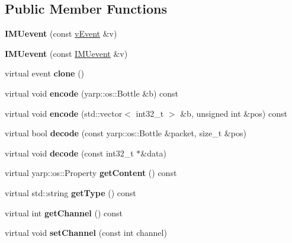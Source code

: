 \subsection*{Public Member Functions}
\begin{DoxyCompactItemize}
\item 
\mbox{\label{classev_1_1IMUevent_aeafbaa4f2d7c17e29174ecfe3f285bfc}} 
{\bfseries I\+M\+Uevent} (const \hyperlink{classev_1_1vEvent}{v\+Event} \&v)
\item 
\mbox{\label{classev_1_1IMUevent_a822d3d8bfd6dbcac987dc4eb1861d8d7}} 
{\bfseries I\+M\+Uevent} (const \hyperlink{classev_1_1IMUevent}{I\+M\+Uevent} \&v)
\item 
\mbox{\label{classev_1_1IMUevent_a0dece317ec94e3f0ab1e40d50549e1c8}} 
virtual event {\bfseries clone} ()
\item 
\mbox{\label{classev_1_1IMUevent_aff5831e99c4174bdd85689c26ce613ba}} 
virtual void {\bfseries encode} (yarp\+::os\+::\+Bottle \&b) const
\item 
\mbox{\label{classev_1_1IMUevent_a171f128d91d028698062060c3df4f632}} 
virtual void {\bfseries encode} (std\+::vector$<$ int32\+\_\+t $>$ \&b, unsigned int \&pos) const
\item 
\mbox{\label{classev_1_1IMUevent_a7fcb5f10ff8b36f9bd0f55cf50dd889d}} 
virtual bool {\bfseries decode} (const yarp\+::os\+::\+Bottle \&packet, size\+\_\+t \&pos)
\item 
\mbox{\label{classev_1_1IMUevent_a5c2c5342b24a5ed9cfb5047cb0c04a88}} 
virtual void {\bfseries decode} (const int32\+\_\+t $\ast$\&data)
\item 
\mbox{\label{classev_1_1IMUevent_af4db138021c3a354726f00e1a0fad1c3}} 
virtual yarp\+::os\+::\+Property {\bfseries get\+Content} () const
\item 
\mbox{\label{classev_1_1IMUevent_a7d8c815714b7dea2aa7636aaddbd4ed4}} 
virtual std\+::string {\bfseries get\+Type} () const
\item 
\mbox{\label{classev_1_1IMUevent_a2faf0a821885f934f760b71f4053b670}} 
virtual int {\bfseries get\+Channel} () const
\item 
\mbox{\label{classev_1_1IMUevent_ae435c3d018265d56c3968bb2f1728995}} 
virtual void {\bfseries set\+Channel} (const int channel)
\end{DoxyCompactItemize}
